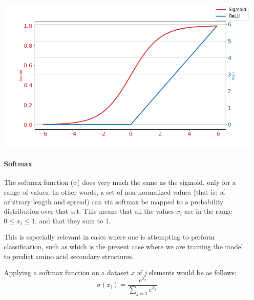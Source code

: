 \begin{multicols}{2}
\begin{Figure}
 \centering
 \includegraphics[width=\linewidth]{../graphs/activation.png}
 \captionsetup{width=0.8\linewidth, font=small}
\end{Figure}



\paragraph{Softmax}
The softmax function ($\sigma$) does very much the same as the sigmoid, only for a range of values. In other words, a set of non-normalized values (that is: of arbitrary length and spread) can via softmax be mapped to a probability distribution over that set. This means that all the values $x_i$ are in the range $0\leq x_i \leq 1$, and that they sum to 1.

This is especially relevant in cases where one is attempting to perform classification, such as which is the present case where we are training the model to predict amino acid secondary structures. 

Applying a softmax function on a dataset \textit{x} of \textit{j} elements would be as follows:
$$
\sigma(x_i) = \frac{e^{x_i}}{\sum_{j=1} e^{x_j}}
$$


\end{multicols}
